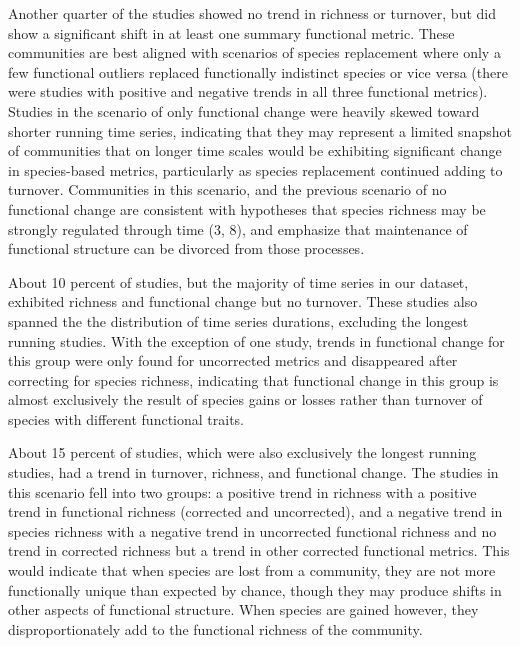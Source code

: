 \documentclass{article}
\begin{document}
Another quarter of the studies showed no trend in richness or turnover,
but did show a significant shift in at least one summary functional
metric. These communities are best aligned with scenarios of species
replacement where only a few functional outliers replaced functionally
indistinct species or vice versa (there were studies with positive and
negative trends in all three functional metrics). Studies in the
scenario of only functional change were heavily skewed toward shorter
running time series, indicating that they may represent a limited
snapshot of communities that on longer time scales would be exhibiting
significant change in species-based metrics, particularly as species
replacement continued adding to turnover. Communities in this scenario,
and the previous scenario of no functional change are consistent with
hypotheses that species richness may be strongly regulated through time
(3, 8), and emphasize that maintenance of functional structure can be
divorced from those processes.

About 10 percent of studies, but the majority of time series in our
dataset, exhibited richness and functional change but no turnover. These
studies also spanned the the distribution of time series durations,
excluding the longest running studies. With the exception of one study,
trends in functional change for this group were only found for
uncorrected metrics and disappeared after correcting for species
richness, indicating that functional change in this group is almost
exclusively the result of species gains or losses rather than turnover
of species with different functional traits.

About 15 percent of studies, which were also exclusively the longest
running studies, had a trend in turnover, richness, and functional
change. The studies in this scenario fell into two groups: a positive
trend in richness with a positive trend in functional richness
(corrected and uncorrected), and a negative trend in species richness
with a negative trend in uncorrected functional richness and no trend in
corrected richness but a trend in other corrected functional metrics.
This would indicate that when species are lost from a community, they
are not more functionally unique than expected by chance, though they
may produce shifts in other aspects of functional structure. When
species are gained however, they disproportionately add to the
functional richness of the community.
\end{document}
